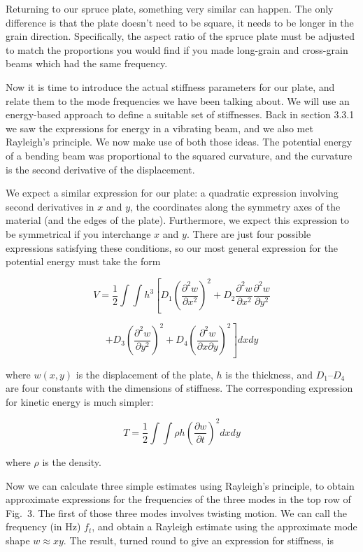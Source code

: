   Returning to our spruce plate, something very similar can happen. The only 
  difference is that the plate doesn’t need to be square, it needs to be longer 
  in the grain direction. Specifically, the aspect ratio of the spruce plate 
  must be adjusted to match the proportions you would find if you made 
  long-grain and cross-grain beams which had the same frequency. 

  Now it is time to introduce the actual stiffness parameters for our plate, 
  and relate them to the mode frequencies we have been talking about. We will 
  use an energy-based approach to define a suitable set of stiffnesses. Back in 
  section 3.3.1 we saw the expressions for energy in a vibrating beam, and we 
  also met Rayleigh's principle. We now make use of both those ideas. The 
  potential energy of a bending beam was proportional to the squared curvature, 
  and the curvature is the second derivative of the displacement. 

  We expect a similar expression for our plate: a quadratic expression 
  involving second derivatives in $x$ and $y$, the coordinates along the 
  symmetry axes of the material (and the edges of the plate). Furthermore, we 
  expect this expression to be symmetrical if you interchange $x$ and $y$. 
  There are just four possible expressions satisfying these conditions, so our 
  most general expression for the potential energy must take the form 

  $$ V = \dfrac{1}{2} \int{\int{h^3 \left[ D_1 \left(\dfrac{\partial^2 
  w}{\partial x^2} \right)^2 + D_2 \dfrac{\partial^2 w}{\partial x^2} 
  \dfrac{\partial^2 w}{\partial y^2} \right. }} $$ 

  $$ \left. + D_3 \left(\dfrac{\partial^2 w}{\partial y^2} \right)^2 + D_4 
  \left(\dfrac{\partial^2 w}{\partial x \partial y} \right)^2 \right] dx dy 
  \tag{1}$$ 

  where $w(x,y)$ is the displacement of the plate, $h$ is the thickness, and 
  $D_1$--$D_4$ are four constants with the dimensions of stiffness. The 
  corresponding expression for kinetic energy is much simpler: 

  $$T=\dfrac{1}{2} \int{\int{ \rho h \left( \dfrac{\partial w}{\partial t} 
  \right)^2 dx dy }} \tag{2}$$ 

  where $\rho$ is the density. 

  Now we can calculate three simple estimates using Rayleigh's principle, to 
  obtain approximate expressions for the frequencies of the three modes in the 
  top row of Fig.\ 3. The first of those three modes involves twisting motion. 
  We can call the frequency (in Hz) $f_t$, and obtain a Rayleigh estimate using 
  the approximate mode shape $w \approx xy .$ The result, turned round to give 
  an expression for stiffness, is 


